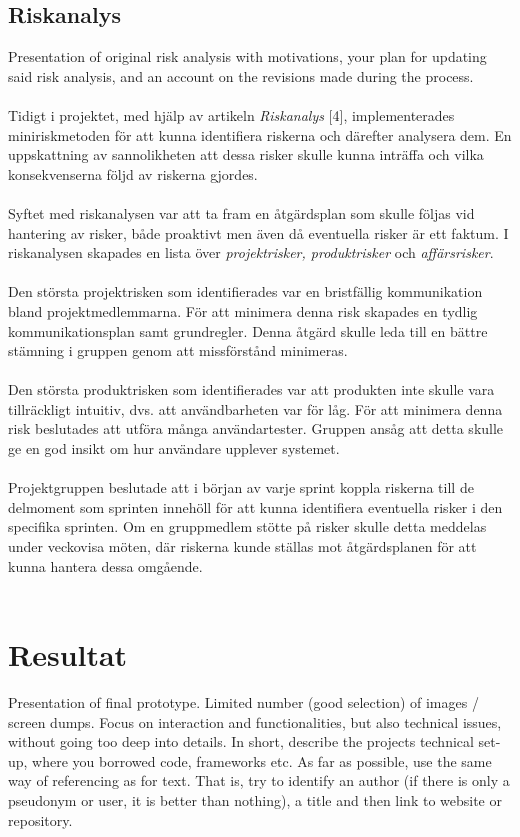 \documentclass[12pt]{article}
\begin{document}
\subsection{Riskanalys}
Presentation of original risk analysis with motivations, your plan for updating said risk analysis, and an account on the revisions made during the process. \\\\
 Tidigt i projektet, med hjälp av artikeln \textit{Riskanalys} [4], implementerades miniriskmetoden för att kunna identifiera riskerna och därefter analysera dem. En uppskattning av sannolikheten att dessa risker skulle kunna inträffa och vilka konsekvenserna följd av riskerna gjordes.\\\\
 Syftet med riskanalysen var att ta fram en åtgärdsplan som skulle följas vid hantering av risker, både proaktivt men även då eventuella risker är ett faktum. I riskanalysen skapades en lista över \textit{projektrisker, produktrisker} och \textit{affärsrisker}.\\\\
 Den största projektrisken som identifierades var en bristfällig kommunikation bland projektmedlemmarna. För att minimera denna risk skapades en tydlig kommunikationsplan samt grundregler. Denna åtgärd skulle leda till en bättre stämning i gruppen genom att missförstånd minimeras.\\\\
 Den största produktrisken som identifierades var att produkten inte skulle vara tillräckligt intuitiv, dvs. att användbarheten var för låg. För att minimera denna risk beslutades att utföra många användartester. Gruppen ansåg att detta skulle ge en god insikt om hur användare upplever systemet.\\\\
 Projektgruppen beslutade att i början av varje sprint koppla riskerna till de delmoment som sprinten innehöll för att kunna identifiera eventuella risker i den specifika sprinten. Om en gruppmedlem stötte på risker skulle detta meddelas under veckovisa möten, där riskerna kunde ställas mot åtgärdsplanen för att kunna hantera dessa omgående.\\\\
 



\section{Resultat}
Presentation of final prototype. Limited number (good selection) of images / screen dumps. Focus on interaction and functionalities, but also technical issues, without going too deep into details. In short, describe the projects technical set-up, where you borrowed code, frameworks etc. As far as possible, use the same way of referencing as for text. That is, try to identify an author (if there is only a pseudonym or user, it is better than nothing), a title and then link to website or repository.
\end{document}
